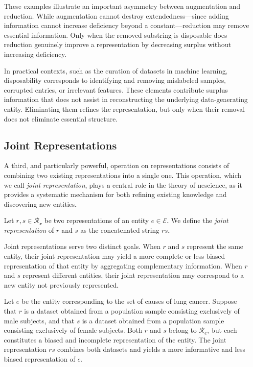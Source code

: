 These examples illustrate an important asymmetry between augmentation and reduction. While augmentation cannot destroy extendedness—since adding information cannot increase deficiency beyond a constant—reduction may remove essential information. Only when the removed substring is disposable does reduction genuinely improve a representation by decreasing surplus without increasing deficiency.

In practical contexts, such as the curation of datasets in machine learning, disposability corresponds to identifying and removing mislabeled samples, corrupted entries, or irrelevant features. These elements contribute surplus information that does not assist in reconstructing the underlying data-generating entity. Eliminating them refines the representation, but only when their removal does not eliminate essential structure.


\subsection*{Joint Representations}

A third, and particularly powerful, operation on representations consists of combining two existing representations into a single one. This operation, which we call \emph{joint representation}, plays a central role in the theory of nescience, as it provides a systematic mechanism for both refining existing knowledge and discovering new entities.

\begin{definition}
Let $r,s \in \mathcal{R}_{\mathcal{e}}$ be two representations of an entity $e \in \mathcal{E}$. We define the  \emph{joint representation} of $r$ and $s$ as the concatenated string $rs$.
\end{definition}

Joint representations serve two distinct goals. When $r$ and $s$ represent the same entity, their joint representation may yield a more complete or less biased representation of that entity by aggregating complementary information. When $r$ and $s$ represent different entities, their joint representation may correspond to a new entity not previously represented.

\begin{example}
\label{ex:lung_cancer_joint}
Let $e$ be the entity corresponding to the set of causes of lung cancer. Suppose that $r$ is a dataset obtained from a population sample consisting exclusively of male subjects, and that $s$ is a dataset obtained from a population sample consisting exclusively of female subjects. Both $r$ and $s$ belong to $\mathcal{R}_e$, but each constitutes a biased and incomplete representation of the entity. The joint representation $rs$ combines both datasets and yields a more informative and less biased representation of $e$.
\end{example}

